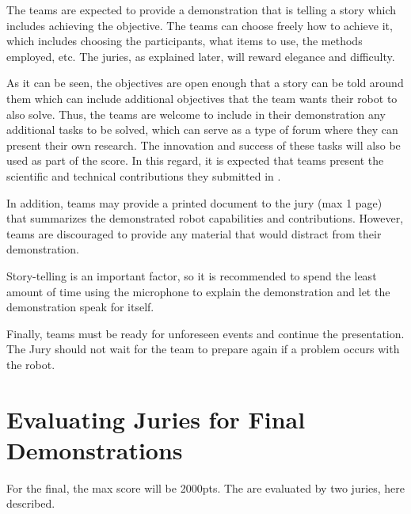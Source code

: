The teams are expected to provide a demonstration that is telling a story which includes achieving the objective. The teams can choose freely how to achieve it, which includes choosing the participants, what items to use, the methods employed, etc. The juries, as explained later, will reward elegance and difficulty.

As it can be seen, the objectives are open enough that a story can be told around them which can include additional objectives that the team wants their robot to also solve. Thus, the teams are welcome to include in their demonstration any additional tasks to be solved, which can serve as a type of forum where they can present their own research. The innovation and success of these tasks will also be used as part of the score. In this regard, it is expected that teams present the scientific and technical contributions they submitted in .

In addition, teams may provide a printed document to the jury (max 1 page) that summarizes the demonstrated robot capabilities and contributions. However, teams are discouraged to provide any material that would distract from their demonstration.

Story-telling is an important factor, so it is recommended to spend the least amount of time using the microphone to explain the demonstration and let the demonstration speak for itself.

Finally, teams must be ready for unforeseen events and continue the presentation. The Jury should not wait for the team to prepare again if a problem occurs with the robot.


\section{Evaluating Juries for Final Demonstrations}
For the final, the max score will be 2000pts.
The  are evaluated by two juries, here described.

